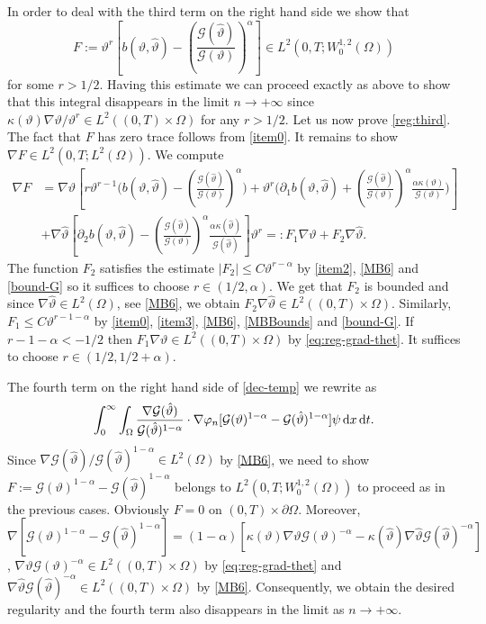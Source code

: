 \documentclass[11pt, a4paper, reqno]{amsart}
\numberwithin{equation}{section}
\newcommand{\thetah}{\hat\thet}
\newcommand{\thet}{\vartheta}
\newcommand{\dt}{\,{\rm d} t }
\newcommand{\dx}{\,{\rm d} {x}}
\newcommand{\G}{\mathcal{G}}
\newcommand{\al}{\alpha}
\newcommand{\intnO}[1]{\int_0^{\infty}\intO{ #1 }\dt}
\newcommand{\intO}[1]{\int_{\Omega} #1 \dx}
\newcommand{\bb}{b}
\begin{document}
In order to deal with the third term on the right hand side we show that
\begin{equation}\label{reg:third}
F:=\thet^r\left[\bb(\thet, \thetah)-\left(\frac{\G(\thetah)}{\G(\thet)}\right)^{\al}\right]\in L^{2}(0,T;W^{1,2}_0(\Omega))
\end{equation}
for some $r>1/2$. Having this estimate we can proceed exactly as above to show that this integral disappears in the limit $n\to+\infty$ since $\kappa(\thet)\nabla \thet/\thet^r\in L^2((0,T)\times\Omega)$ for any $r>1/2$. Let us now prove \eqref{reg:third}. The fact that $F$ has zero trace follows from \eqref{item0}. It remains to show $\nabla F\in L^2(0,T;L^2(\Omega))$. We compute
\begin{align*}
  \nabla F&=\nabla\thet\left[r\thet^{r-1}\big(\bb(\thet,\thetah)-\left(\frac{\G(\thetah)}{\G(\thet)}\right)^{\al}\big)+\thet^r\big(\partial_1\bb(\thet,\thetah)+\left(\frac{\G(\thetah)}{\G(\thet)}\right)^{\al}\frac{\al\kappa(\thet)}{\G(\thet)}\big)\right]\\
  &+\nabla\thetah\left[\partial_2\bb(\thet,\thetah)-\left(\frac{\G(\thetah)}{\G(\thet)}\right)^{\al}\frac{\al\kappa(\thetah)}{\G(\thetah)}\right]\thet^r=:F_1\nabla\thet+F_2\nabla\thetah.
\end{align*}
The function $F_2$ satisfies the estimate $|F_2|\leq C\thet^{r-\alpha}$ by \eqref{item2}, \eqref{MB6} and \eqref{bound-G} so it suffices to choose $r\in(1/2,\alpha)$. We get that $F_2$ is bounded and since $\nabla\thetah\in L^2(\Omega)$, see \eqref{MB6}, we obtain $F_2\nabla\thetah\in L^2((0,T)\times\Omega)$. Similarly, $F_1\leq C\thet^{r-1-\alpha}$ by \eqref{item0}, \eqref{item3}, \eqref{MB6}, \eqref{MBBounds} and \eqref{bound-G}. If $r-1-\al<-1/2$ then $F_1\nabla\thet\in L^2((0,T)\times\Omega)$ by \eqref{eq:reg-grad-thet}. It suffices to choose $r\in(1/2, 1/2 +\alpha)$. 

The fourth term on the right hand side of \eqref{dec-temp} we rewrite as
$$
\intnO{\frac{\nabla \G(\thetah)}{\G(\thetah)^{1-\al}}\cdot \nabla\varphi_n  [\G(\thet)^{1-\al}-\G(\thetah)^{1-\al}] \psi}.
$$
Since $\nabla \G(\thetah)/\G(\thetah)^{1-\al}\in L^2(\Omega)$ by \eqref{MB6}, we need to show $F:=\G(\thet)^{1-\al}-\G(\thetah)^{1-\al}$ belongs to $ L^2(0,T;W^{1,2}_0(\Omega))$ to proceed as in the previous cases. Obviously $F=0$ on $(0,T)\times\partial \Omega$. Moreover, $\nabla[\G(\thet)^{1-\al}-\G(\thetah)^{1-\al}]=(1-\al)[\kappa(\thet)\nabla\thet\G(\thet)^{-\al}-\kappa(\thetah)\nabla\thetah\G(\thetah)^{-\al}]$, $\nabla\thet\G(\thet)^{-\al}\in L^2((0,T)\times\Omega)$ by \eqref{eq:reg-grad-thet} and $\nabla\thetah\G(\thetah)^{-\al}\in L^2((0,T)\times\Omega)$ by \eqref{MB6}. Consequently, we obtain the desired regularity and the fourth term also disappears in the limit as $n\to+\infty$. 
\end{document}
